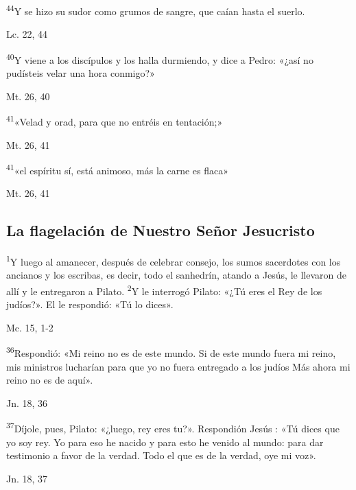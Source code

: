 \documentclass[a4paper,11pt]{article}
\begin{document}
      \textsuperscript{44}Y se hizo su sudor como grumos de sangre, que caían hasta el suerlo.
      \begin{flushright}
        Lc. 22, 44
      \end{flushright}

      \textsuperscript{40}Y viene a los discípulos y los halla durmiendo, y dice a Pedro: «¿así no pudísteis velar una hora conmigo?»
      \begin{flushright}
        Mt. 26, 40
      \end{flushright}

      \textsuperscript{41}«Velad y orad, para que no entréis en tentación;»
      \begin{flushright}
        Mt. 26, 41
      \end{flushright}

      \textsuperscript{41}«el espíritu sí, está animoso, más la carne es flaca»
      \begin{flushright}
        Mt. 26, 41
      \end{flushright}

    \subsection*{\hfil La flagelación de Nuestro Señor Jesucristo \hfil}
      
      \textsuperscript{1}Y luego al amanecer, después de celebrar consejo, los sumos sacerdotes con los ancianos y los escribas, es decir, todo el sanhedrín, atando a Jesús,
      le llevaron de allí y le entregaron a Pilato. \textsuperscript{2}Y le interrogó Pilato: «¿Tú eres el Rey de los judíos?». El le respondió: «Tú lo dices».
      \begin{flushright}
        Mc. 15, 1-2
      \end{flushright}

      \textsuperscript{36}Respondió: «Mi reino no es de este mundo. Si de este mundo fuera mi reino, mis ministros lucharían para que yo no fuera entregado a los judíos
      Más ahora mi reino no es de aquí».
      \begin{flushright}
        Jn. 18, 36
      \end{flushright}

      \textsuperscript{37}Díjole, pues, Pilato: «¿luego, rey eres tu?». Respondión Jesús : «Tú dices que yo soy rey. Yo para eso he nacido y para esto he venido
      al mundo: para dar testimonio a favor de la verdad. Todo el que es de la verdad, oye mi voz».
      \begin{flushright}
        Jn. 18, 37
      \end{flushright}
\end{document}
